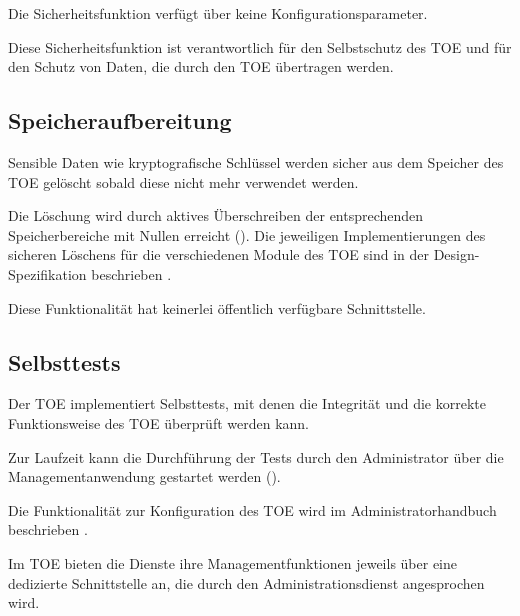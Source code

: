 

Die Sicherheitsfunktion verfügt über keine Konfigurationsparameter.

\sfbeschreibung{}

Diese Sicherheitsfunktion ist verantwortlich für den Selbstschutz des
TOE und für den Schutz von Daten, die durch den TOE übertragen werden.

\subsection{Speicheraufbereitung}\label{sf.selfprotection.rip}

Sensible Daten wie kryptografische Schlüssel werden sicher aus dem Speicher des
TOE gelöscht sobald diese nicht mehr verwendet werden.

Die Löschung wird durch aktives Überschreiben der entsprechenden
Speicherbereiche mit Nullen erreicht (). Die jeweiligen
Implementierungen des sicheren Löschens für die verschiedenen Module des TOE
sind in der Design-Spezifikation beschrieben \cite{adv_tds}.

Diese Funktionalität hat keinerlei öffentlich verfügbare
Schnittstelle. 
\subsection{Selbsttests}\label{sf.selfprotection.selftest}

Der TOE implementiert Selbsttests, mit denen die Integrität und die
korrekte Funktionsweise des TOE überprüft werden kann.

Zur Laufzeit kann die Durchführung der Tests durch den Administrator
über die Managementanwendung gestartet werden ().

%



Die Funktionalität zur Konfiguration des TOE wird im Administratorhandbuch
beschrieben \autocite[Abschnitte~7.3 bis~7.6]{agd_adm}. 

\sfbeschreibung{}

Im TOE bieten die Dienste ihre Managementfunktionen jeweils über eine dedizierte
Schnittstelle an, die durch den Administrationsdienst angesprochen wird.

